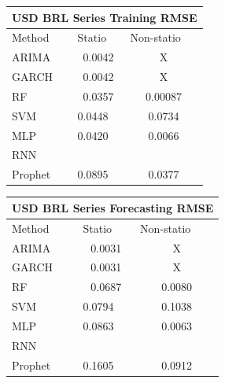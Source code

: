 \documentclass[10pt,twocolumn,letterpaper]{article}
\begin{document}
\begin{table}[h]\label{table:usdbrltrainingRMSE}
	\centering
	\begin{tabular}{|lll|}
		\hline
		\multicolumn{3}{|c|}{USD BRL Series Training RMSE}                                                  \\ \hline
		\multicolumn{1}{|l|}{Method}  & \multicolumn{1}{l|}{Statio} & Non-statio             \\ \hline
		\multicolumn{1}{|l|}{ARIMA}   & \multicolumn{1}{c|}{0.0042}       & \multicolumn{1}{c|}{X} \\ \hline
		\multicolumn{1}{|l|}{GARCH}   & \multicolumn{1}{c|}{0.0042}       & \multicolumn{1}{c|}{X} \\ \hline
		\multicolumn{1}{|l|}{RF}      & \multicolumn{1}{c|}{0.0357}       & \multicolumn{1}{c|}{0.00087}  \\ \hline
		\multicolumn{1}{|l|}{SVM}     & \multicolumn{1}{l|}{0.0448}       & \multicolumn{1}{c|}{0.0734}  \\ \hline
		\multicolumn{1}{|l|}{MLP}     & \multicolumn{1}{l|}{0.0420}       & \multicolumn{1}{c|}{0.0066}  \\ \hline
		\multicolumn{1}{|l|}{RNN}     & \multicolumn{1}{l|}{}       & \multicolumn{1}{c|}{}  \\ \hline
		\multicolumn{1}{|l|}{Prophet} & \multicolumn{1}{l|}{0.0895}       & \multicolumn{1}{c|}{0.0377}  \\ \hline
	\end{tabular}
\end{table}

\begin{table}[h]
	\label{table:usdbrlforecastRMSE}
	\centering
	\begin{tabular}{|lll|}
		\hline
		\multicolumn{3}{|c|}{USD BRL Series Forecasting RMSE}                                                  \\ \hline
		\multicolumn{1}{|l|}{Method}  & \multicolumn{1}{l|}{Statio} & Non-statio             \\ \hline
		\multicolumn{1}{|l|}{ARIMA}   & \multicolumn{1}{c|}{0.0031}       & \multicolumn{1}{c|}{X} \\ \hline
		\multicolumn{1}{|l|}{GARCH}   & \multicolumn{1}{c|}{0.0031}       & \multicolumn{1}{c|}{X} \\ \hline
		\multicolumn{1}{|l|}{RF}      & \multicolumn{1}{c|}{0.0687}       & \multicolumn{1}{c|}{0.0080}  \\ \hline
		\multicolumn{1}{|l|}{SVM}     & \multicolumn{1}{l|}{0.0794}       & \multicolumn{1}{c|}{0.1038}  \\ \hline
		\multicolumn{1}{|l|}{MLP}     & \multicolumn{1}{l|}{0.0863}       & \multicolumn{1}{c|}{0.0063}  \\ \hline
		\multicolumn{1}{|l|}{RNN}     & \multicolumn{1}{l|}{}       & \multicolumn{1}{c|}{}  \\ \hline
		\multicolumn{1}{|l|}{Prophet} & \multicolumn{1}{l|}{0.1605}       & \multicolumn{1}{c|}{0.0912}  \\ \hline
	\end{tabular}
\end{table}












{\small


}
\end{document}
